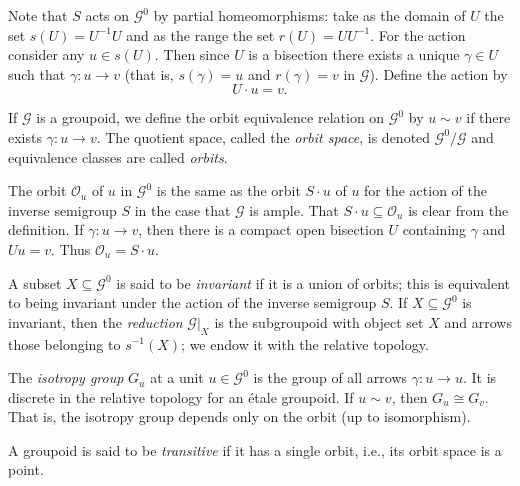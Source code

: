 \documentclass[11pt,reqno]{amsart}
\theoremstyle{plain}
\numberwithin{equation}{section}
\newcommand{\G}[0]{\mathscr{G}}
\newcommand{\orb}[0]{\mathcal{O}}
\begin{document}
Note that $S$ acts on $\G^0$ by partial homeomorphisms: take as the domain of $U$ the set $s(U)=U^{-1}U$ and as the range the set $r(U)=UU^{-1}$. For the action consider any $u \in s(U)$. Then since $U$ is a bisection there exists a unique $\gamma \in U$ such that $\gamma\colon u\to v$ (that is, $s(\gamma)=u$ and  $r(\gamma)=v$ in $\G$). Define the action  by \[ U\cdot u =v.\]

If $\mathscr G$ is a groupoid, we define the orbit equivalence relation on $\mathscr G^0$ by $u\sim v$ if there exists $\gamma\colon u\to v$.  The quotient space, called the \emph{orbit space}, is denoted $\mathscr G^0/\mathscr G$ and equivalence classes are called \emph{orbits}.

The orbit $\orb_u$ of $u$ in $\G^0$ is the same as the orbit $S\cdot u$ of $u$ for the action of the inverse semigroup $S$ in the case that $\mathscr G$ is ample.  That $S\cdot u\subseteq \orb_u$ is clear from the definition.  If $\gamma\colon u\to v$, then there is a compact open bisection $U$ containing $\gamma$ and $Uu=v$.  Thus $\orb_u=S\cdot u$.

A subset $X\subseteq \mathscr G^0$ is said to be \emph{invariant} if it is a union of orbits; this is equivalent to being invariant under the action of  the inverse semigroup $S$.
If $X\subseteq \mathscr G^0$ is invariant, then the \emph{reduction} $\mathscr G|_X$ is the subgroupoid with object set $X$ and arrows those belonging to $s^{-1}(X)$; we endow it with the relative topology.

The \emph{isotropy group} $G_u$ at a unit $u\in \mathscr G^0$ is the group of all arrows $\gamma\colon u\to u$.  It is discrete in the relative topology for an \'etale groupoid.  If $u\sim v$, then $G_u\cong G_v$.  That is, the isotropy group depends only on the orbit (up to isomorphism).

A groupoid is said to be \emph{transitive} if it has a single orbit, i.e., its orbit space is a point.
\end{document}
